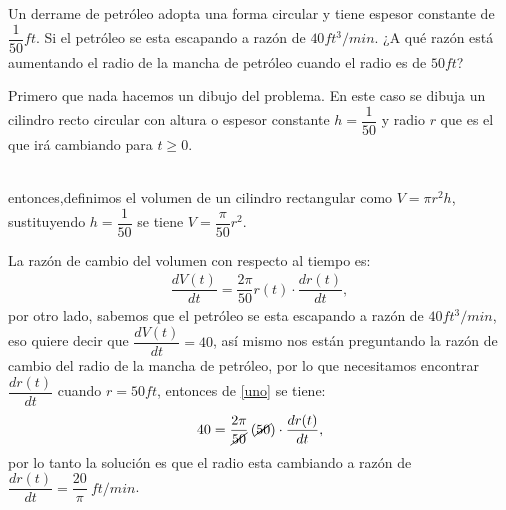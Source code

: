 \documentclass[legalpaper, 12pt]{exam}
\begin{document}
\begin{questions}
\question  Un derrame de petróleo adopta una forma circular y tiene espesor constante de $\dfrac{1}{50} ft$. Si el petróleo se esta escapando a razón de $40 ft^3/min$. ¿A qué razón está aumentando  el radio de la mancha de petróleo cuando el radio es de $50ft$?
\begin{solution}[.2in]
Primero que nada hacemos un dibujo del problema. En este caso se dibuja un cilindro recto circular con altura o espesor constante $h=\dfrac{1}{50}$ y radio $r$ que es el que irá cambiando para $t\geq 0$.\\

\begin{multicols}{2}
\\
entonces,definimos el volumen de un cilindro rectangular como $V = \pi r^2 h$, sustituyendo $h = \dfrac{1}{50}$ se tiene $V = \dfrac{\pi}{50}r^2$.
\end{multicols}
La razón de cambio del volumen con respecto al tiempo es:
\begin{align}
\dfrac{dV(t)}{dt} = \dfrac{2\pi}{50}r(t)\cdot\dfrac{dr(t)}{dt},\label{uno}
\end{align}
por otro lado, sabemos que el petróleo se esta escapando a razón de $40 ft^3/min$, eso quiere decir que $\dfrac{dV(t)}{dt}=40$, así mismo nos están preguntando la razón de cambio del radio de la mancha de petróleo, por lo que necesitamos encontrar $\dfrac{dr(t)}{dt}$ cuando $r = 50 ft$, entonces de \eqref{uno} se tiene:
\begin{align*}
40 = \dfrac{2\pi}{\cancel{50}}\left(\cancel{50}\right)\cdot\dfrac{dr(t)}{dt},
\end{align*}
por lo tanto la solución es que el radio esta cambiando a razón de $\dfrac{dr(t)}{dt} = \dfrac{20}{\pi}\ ft/min$.
\end{solution}


\end{questions}
\end{document}
